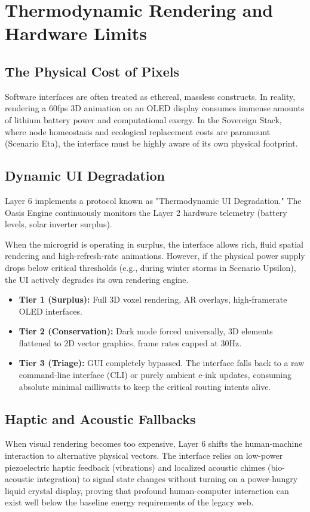 \chapter{Thermodynamic Rendering and Hardware Limits}

\section{The Physical Cost of Pixels}
Software interfaces are often treated as ethereal, massless constructs. In reality, rendering a 60fps 3D animation on an OLED display consumes immense amounts of lithium battery power and computational exergy. In the Sovereign Stack, where node homeostasis and ecological replacement costs are paramount (Scenario Eta), the interface must be highly aware of its own physical footprint.

\section{Dynamic UI Degradation}
Layer 6 implements a protocol known as "Thermodynamic UI Degradation." The Oasis Engine continuously monitors the Layer 2 hardware telemetry (battery levels, solar inverter surplus). 

When the microgrid is operating in surplus, the interface allows rich, fluid spatial rendering and high-refresh-rate animations. However, if the physical power supply drops below critical thresholds (e.g., during winter storms in Scenario Upsilon), the UI actively degrades its own rendering engine.
\begin{itemize}
    \item \textbf{Tier 1 (Surplus):} Full 3D voxel rendering, AR overlays, high-framerate OLED interfaces.
    \item \textbf{Tier 2 (Conservation):} Dark mode forced universally, 3D elements flattened to 2D vector graphics, frame rates capped at 30Hz.
    \item \textbf{Tier 3 (Triage):} GUI completely bypassed. The interface falls back to a raw command-line interface (CLI) or purely ambient e-ink updates, consuming absolute minimal milliwatts to keep the critical routing intents alive.
\end{itemize}

\section{Haptic and Acoustic Fallbacks}
When visual rendering becomes too expensive, Layer 6 shifts the human-machine interaction to alternative physical vectors. The interface relies on low-power piezoelectric haptic feedback (vibrations) and localized acoustic chimes (bio-acoustic integration) to signal state changes without turning on a power-hungry liquid crystal display, proving that profound human-computer interaction can exist well below the baseline energy requirements of the legacy web.

